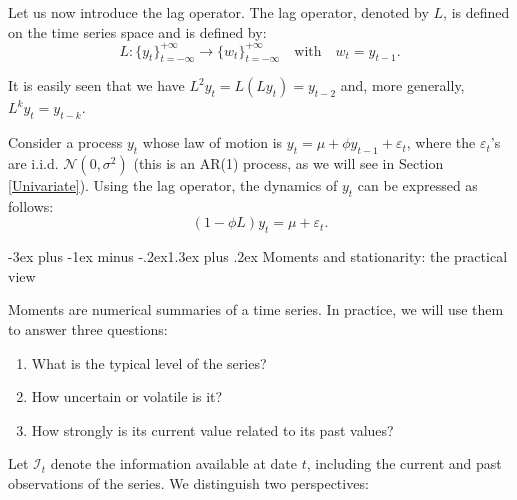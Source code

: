 \documentclass[
  11pt,
]{book}
\makeatletter
\providecommand{\tightlist}{%
  \setlength{\itemsep}{0pt}\setlength{\parskip}{0pt}}
\renewcommand\section{\@startsection{section}{1}{\z@}
  {-3ex plus -1ex minus -.2ex}{1.3ex plus .2ex}
  {\normalfont\Large\bfseries\color{TextbookInk}}}
\theoremstyle{definition}
\theoremstyle{definition}
\theoremstyle{definition}
\theoremstyle{definition}
\theoremstyle{remark}
\makeatother
\begin{document}
Let us now introduce the lag operator. The lag operator, denoted by \(L\), is defined on the time series space and is defined by:
\begin{equation}
L: \{y_t\}_{t=-\infty}^{+\infty} \rightarrow \{w_t\}_{t=-\infty}^{+\infty} \quad \mbox{with} \quad w_t = y_{t-1}.\label{eq:lagOp}
\end{equation}

It is easily seen that we have \(L^2 y_t =L(L y_t) = y_{t-2}\) and, more generally, \(L^k y_t = y_{t-k}\).

Consider a process \(y_t\) whose law of motion is \(y_t = \mu + \phi y_{t-1} + \varepsilon_t\), where the \(\varepsilon_t\)'s are i.i.d. \(\mathcal{N}(0,\sigma^2)\) (this is an AR(1) process, as we will see in Section \ref{Univariate}). Using the lag operator, the dynamics of \(y_t\) can be expressed as follows:
\[
(1-\phi L) y_t = \mu + \varepsilon_t.
\]

\section{Moments and stationarity: the practical view}\label{conditional-and-unconditional-moments}

Moments are numerical summaries of a time series. In practice, we will use them to answer three questions:

\begin{enumerate}
\def\labelenumi{\arabic{enumi}.}
\tightlist
\item
  What is the typical level of the series?
\item
  How uncertain or volatile is it?
\item
  How strongly is its current value related to its past values?
\end{enumerate}

Let \(\mathcal{I}_t\) denote the information available at date \(t\), including the current and past observations of the series. We distinguish two perspectives:
\end{document}
